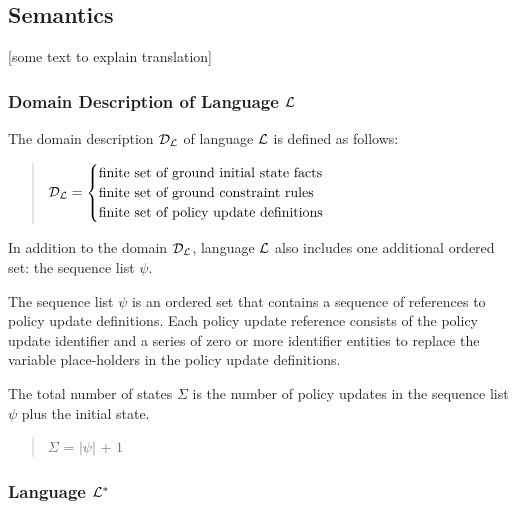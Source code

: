 \documentclass[10pt, twocolumn]{article}
\begin{document}
    \subsection{Semantics}

      [some text to explain translation]

      \subsubsection{Domain Description of Language ${\cal L}$}

        The domain description ${\cal D}_{\cal L}$ of language ${\cal L}$ is
        defined as follows:

        \begin{quote}
          \begin{math}
            {\cal D}_{\cal L} = 
            \begin{cases}
              \mbox{finite set of ground initial state facts} \\
              \mbox{finite set of ground constraint rules} \\
              \mbox{finite set of policy update definitions}
            \end{cases}
          \end{math}
        \end{quote}

        In addition to the domain ${\cal D}_{\cal L}$, language ${\cal L}$
        also includes one additional ordered set: the sequence list $\psi$.

        The sequence list $\psi$ is an ordered set that contains a sequence of
        references to policy update definitions. Each policy update reference
        consists of the policy update identifier and a series of zero or more
        identifier entities to replace the variable place-holders in the policy
        update definitions.

        The total number of states $\Sigma$ is the number of policy updates in
        the sequence list $\psi$ plus the initial state.

        \begin{quote}
          $\Sigma$ = $|\psi|$ + $1$
        \end{quote}

      \subsubsection{Language ${\cal L}^{*}$}
\end{document}
